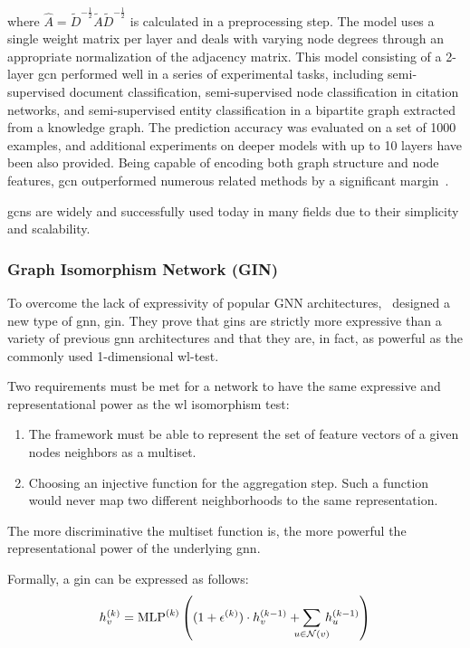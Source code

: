 where $\hat{A} = \tilde{D}^{-\frac{1}{2}}\tilde{A}\tilde{D}^{-\frac{1}{2}}$
is calculated in a preprocessing step. The model uses a single weight matrix per layer and
deals with varying node degrees through an appropriate normalization of the adjacency matrix.
This model consisting of a 2-layer \ac{gcn} performed well in a series of experimental tasks, including semi-supervised document classification, semi-supervised node classification in citation networks, and semi-supervised entity classification in a bipartite graph extracted from a knowledge graph.
The prediction accuracy was evaluated on a set of 1000 examples, and additional experiments on deeper models with up to 10 layers have been also provided. Being capable of encoding both graph structure and node features, \ac{gcn} outperformed numerous related methods by a significant margin~\cite{Kipf2017}.

\Acfp{gcn} are widely and successfully used today in many fields due to their simplicity and scalability.

\subsubsection{Graph Isomorphism Network (GIN)}
\label{sec:related:architectures:gin}
To overcome the lack of expressivity of popular GNN architectures,~\citet{Xu2019} designed a new type of \ac{gnn}, \ac{gin}. They prove that \acp{gin} are strictly more expressive than a variety of previous \ac{gnn} architectures and that they are, in fact, as powerful as the commonly used 1-dimensional \acf{wl}-test.

Two requirements must be met for a network to have the same expressive and representational
power as the \ac{wl} isomorphism test:
\begin{enumerate}
    \item The framework must be able to represent the set of feature vectors of a given nodes
          neighbors as a multiset.
    \item Choosing an injective function for the aggregation step. Such a function would never
          map two different neighborhoods to the same representation.
\end{enumerate}
The more discriminative the multiset function is, the more powerful the representational power of the underlying \ac{gnn}.

Formally, a \acf{gin} can be expressed as follows:
\begin{align*}
    h^{(k)}_{v}  = \mathrm{MLP}^{(k)} \left((1 + \epsilon^{(k)}) \cdot h^{(k-1)}_{v} + \smashoperator{\sum_{{u} \in{\mathcal{N}(v)}}} \,h^{(k-1)}_{u}\right) \\
\end{align*}

